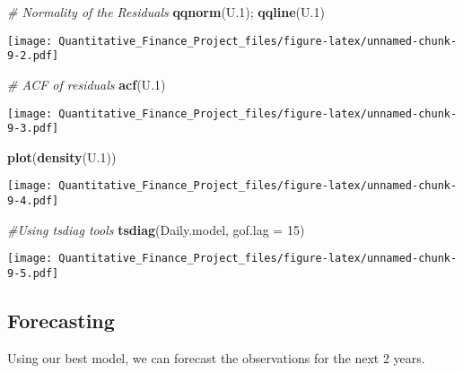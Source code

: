 \documentclass[
]{article}
\newenvironment{Shaded}{\begin{snugshade}}{\end{snugshade}}
\newcommand{\AttributeTok}[1]{\textcolor[rgb]{0.13,0.29,0.53}{#1}}
\newcommand{\CommentTok}[1]{\textcolor[rgb]{0.56,0.35,0.01}{\textit{#1}}}
\newcommand{\DecValTok}[1]{\textcolor[rgb]{0.00,0.00,0.81}{#1}}
\newcommand{\FloatTok}[1]{\textcolor[rgb]{0.00,0.00,0.81}{#1}}
\newcommand{\FunctionTok}[1]{\textcolor[rgb]{0.13,0.29,0.53}{\textbf{#1}}}
\newcommand{\NormalTok}[1]{#1}
\newcommand{\OtherTok}[1]{\textcolor[rgb]{0.56,0.35,0.01}{#1}}
\newcommand{\SpecialCharTok}[1]{\textcolor[rgb]{0.81,0.36,0.00}{\textbf{#1}}}
\newcommand{\StringTok}[1]{\textcolor[rgb]{0.31,0.60,0.02}{#1}}
\begin{document}
\begin{Shaded}
\begin{Highlighting}[]
\CommentTok{\# Normality of the Residuals}
\FunctionTok{qqnorm}\NormalTok{(U}\FloatTok{.1}\NormalTok{); }\FunctionTok{qqline}\NormalTok{(U}\FloatTok{.1}\NormalTok{)}
\end{Highlighting}
\end{Shaded}

\texttt{[image: Quantitative\_Finance\_Project\_files/figure-latex/unnamed-chunk-9-2.pdf]}

\begin{Shaded}
\begin{Highlighting}[]
\CommentTok{\# ACF of residuals}
\FunctionTok{acf}\NormalTok{(U}\FloatTok{.1}\NormalTok{)}
\end{Highlighting}
\end{Shaded}

\texttt{[image: Quantitative\_Finance\_Project\_files/figure-latex/unnamed-chunk-9-3.pdf]}

\begin{Shaded}
\begin{Highlighting}[]
\FunctionTok{plot}\NormalTok{(}\FunctionTok{density}\NormalTok{(U}\FloatTok{.1}\NormalTok{))}
\end{Highlighting}
\end{Shaded}

\texttt{[image: Quantitative\_Finance\_Project\_files/figure-latex/unnamed-chunk-9-4.pdf]}

\begin{Shaded}
\begin{Highlighting}[]
\CommentTok{\#Using tsdiag tools}
\FunctionTok{tsdiag}\NormalTok{(Daily.model, }\AttributeTok{gof.lag =} \DecValTok{15}\NormalTok{)}
\end{Highlighting}
\end{Shaded}

\texttt{[image: Quantitative\_Finance\_Project\_files/figure-latex/unnamed-chunk-9-5.pdf]}

\hypertarget{forecasting}{%
\subsection{Forecasting}\label{forecasting}}

Using our best model, we can forecast the observations for the next 2
years.

\begin{Shaded}
\end{Shaded}
\end{document}
